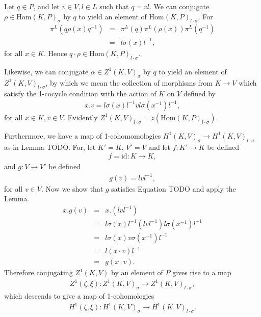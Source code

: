 Let $q \in P$, and let $v \in V, l \in L$ such that $q = vl$. We can conjugate $\rho \in \mathrm{Hom}(K, P)_\sigma$ by $q$ to yield an element of $\mathrm{Hom}(K, P)_{l \cdot \sigma}$. For
\begin{eqnarray*}%
\pi^L\left(q \rho(x) q^{-1}\right)%
&=& \pi^L\left(q\right) \pi^L\left(\rho(x)\right) \pi^L\left(q^{-1}\right) \\
&=& l \sigma(x) l^{-1},
\end{eqnarray*}
for all $x \in K$. Hence $q \cdot \rho \in \mathrm{Hom}(K, P)_{l\cdot \sigma}$.

Likewise, we can conjugate $\alpha \in Z^1(K, V)_\sigma$ by $q$ to yield an element of $Z^1(K, V)_{l \cdot \sigma}$, by which we mean the collection of morphisms from $K \rightarrow V$ which satisfy the 1-cocycle condition with the action of $K$ on $V$ defined by
\begin{eqnarray*}
	x.v = l \sigma(x) l^{-1} v l \sigma(x^{-1}) l^{-1},
\end{eqnarray*}
for all $x \in K, v\in V$. Evidently $Z^1(K, V)_{l \cdot \sigma} = z\left(\mathrm{Hom}(K, P)_{l \cdot \sigma}\right)$.

Furthermore, we have a map of 1-cohomomologies $H^1(K, V)_\sigma \rightarrow H^1(K, V)_{l \cdot \sigma}$ as in Lemma TODO.
	For, let $K' = K$, $V' = V$ and let $f:K' \rightarrow K$ be defined
	\begin{eqnarray*}
		f = \mathrm{id}:K \rightarrow K,
	\end{eqnarray*}
	and $g: V \rightarrow V'$ be defined
	\begin{eqnarray*}
		g(v) = lvl^{-1},
	\end{eqnarray*}
	for all $v \in V$. Now we show that $g$ satisfies Equation TODO and apply the Lemma.
	\begin{eqnarray*}
		x . g(v) &=& x . \left(lvl^{-1}\right) \\
		&=& l\sigma(x)l^{-1} \left(lvl^{-1}\right) l\sigma(x^{-1})l^{-1} \\
		&=& l\sigma(x)v\sigma(x^{-1})l^{-1} \\
		&=& l\left(x \cdot v \right)l^{-1} \\
		&=& g\left(x \cdot v \right).
	\end{eqnarray*}
	Therefore conjugating $Z^1(K, V)$ by an element of $P$ gives rise to a map
	\begin{eqnarray*}
		Z^1(\zeta, \xi):Z^1(K, V)_\sigma \rightarrow Z^1(K, V)_{l \cdot \sigma},
	\end{eqnarray*}
	which descends to give a map of 1-cohomologies
	\begin{eqnarray*}
		H^1(\zeta, \xi):H^1(K, V)_\sigma \rightarrow H^1(K, V)_{l \cdot \sigma}.
	\end{eqnarray*}

